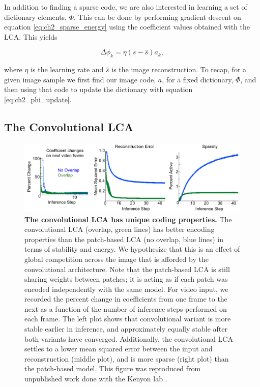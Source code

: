 In addition to finding a sparse code, we are also interested in learning a set of dictionary elements, $\Phi$. This can be done by performing gradient descent on equation \eqref{eq:ch2_sparse_energy} using the coefficient values obtained with the LCA. This yields

\begin{equation}\label{eq:ch2_phi_update}
    \Delta \phi_{k} = \eta (s - \hat{s}) a_{k},
\end{equation}

\noindent where $\eta$ is the learning rate and $\hat{s}$ is the image reconstruction. To recap, for a given image sample we first find our image code, $a$, for a fixed dictionary, $\Phi$, and then using that code to update the dictionary with equation \eqref{eq:ch2_phi_update}.


\subsection{The Convolutional LCA}

\begin{figure}[h]
    \centering
    \includegraphics[width=\textwidth]{figures/lca_conv_benefits.png}
    \caption{\textbf{The convolutional LCA has unique coding properties.} The convolutional LCA (overlap, green lines) has better encoding properties than the patch-based LCA (no overlap, blue lines) in terms of stability and energy. We hypothesize that this is an effect of global competition across the image that is afforded by the convolutional architecture. Note that the patch-based LCA is still sharing weights between patches; it is acting as if each patch was encoded independently with the same model. For video input, we recorded the percent change in coefficients from one frame to the next as a function of the number of inference steps performed on each frame. The left plot shows that convolutional variant is more stable earlier in inference, and approximately equally stable after both variants have converged. Additionally, the convolutional LCA settles to a lower mean squared error between the input and reconstruction (middle plot), and is more sparse (right plot) than the patch-based model. This figure was reproduced from unpublished work done with the Kenyon lab \parencite{paiton2013deep}.}
    \label{fig:ch2_lca_conv_benefit}   
\end{figure}

